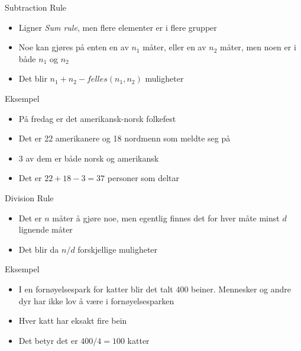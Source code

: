 \begin{frame}
\begin{block}{Subtraction Rule}
\begin{itemize}
\item Ligner \textit{Sum rule}, men flere elementer er i flere grupper
\item Noe kan gjøres på enten en av $n_1$ måter, eller en av $n_2$ måter, men noen er i både $n_1$ og $n_2$
\item Det blir $n_1+n_2-felles(n_1,n_2)$ muligheter
\end{itemize}
\end{block}
\pause
\begin{block}{Eksempel}
\begin{itemize}
\item På fredag er det amerikansk-norsk folkefest
\item Det er 22 amerikanere og 18 nordmenn som meldte seg på
\item 3 av dem er både norsk og amerikansk
\item Det er $22+18-3=37$ personer som deltar
\end{itemize}
\end{block}
\end{frame}

\begin{frame}
\begin{block}{Division Rule}
\begin{itemize}
\item Det er $n$ måter å gjøre noe, men egentlig finnes det for hver måte minst $d$ lignende måter
\item Det blir da $n/d$ forskjellige muligheter
\end{itemize}
\end{block}
\pause
\begin{block}{Eksempel}
\begin{itemize}
\item I en fornøyelsespark for katter blir det talt 400 beiner. Mennesker og andre dyr har ikke lov å være i fornøyelsesparken
\item Hver katt har eksakt fire bein
\item Det betyr det er $400/4=100$ katter
\end{itemize}
\end{block}
\end{frame}

